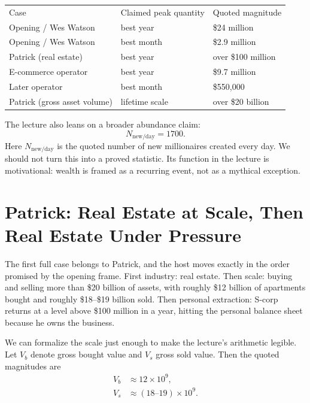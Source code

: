 \begin{table}[h]
\centering
\begin{tabular}{lll}
Case & Claimed peak quantity & Quoted magnitude \\
Opening / Wes Watson & best year & \$24 million \\
Opening / Wes Watson & best month & \$2.9 million \\
Patrick (real estate) & best year & over \$100 million \\
E-commerce operator & best year & \$9.7 million \\
Later operator & best month & \$550{,}000 \\
Patrick (gross asset volume) & lifetime scale & over \$20 billion \\
\end{tabular}
\end{table}

The lecture also leans on a broader abundance claim:
\begin{equation}
N_{\mathrm{new/day}} = 1700.
\end{equation}
Here \(N_{\mathrm{new/day}}\) is the quoted number of new millionaires created every day. We should not turn this into a proved statistic. Its function in the lecture is motivational: wealth is framed as a recurring event, not as a mythical exception.

\section{Patrick: Real Estate at Scale, Then Real Estate Under Pressure}

The first full case belongs to Patrick, and the host moves exactly in the order promised by the opening frame. First industry: real estate. Then scale: buying and selling more than \$20 billion of assets, with roughly \$12 billion of apartments bought and roughly \$18--\$19 billion sold. Then personal extraction: S-corp returns at a level above \$100 million in a year, hitting the personal balance sheet because he owns the business.

We can formalize the scale just enough to make the lecture's arithmetic legible. Let \(V_b\) denote gross bought value and \(V_s\) gross sold value. Then the quoted magnitudes are
\begin{align}
V_b &\approx 12\times 10^9,\\
V_s &\approx (18\text{--}19)\times 10^9.
\end{align}

